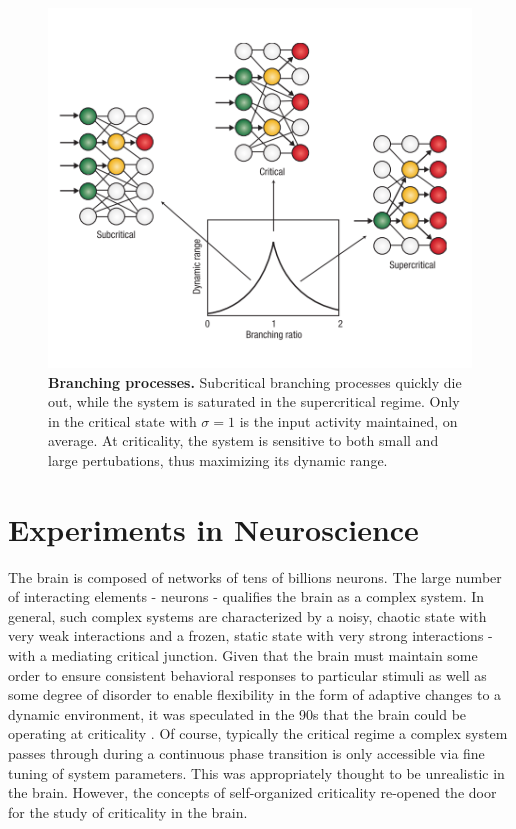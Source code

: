 \documentclass[12pt]{article}
\begin{document}
\begin{figure}      
  \begin{center}    
 \includegraphics[width=.55\textwidth]{Branchingprocesschialvo}    
    \caption{\textbf{Branching processes.} Subcritical branching processes quickly die out, while the system is saturated in the supercritical regime. Only in the critical state with $\sigma = 1$ is the input activity maintained, on average. At criticality, the system is sensitive to both small and large pertubations, thus maximizing its dynamic range. \cite{Chialvo2006a}}   
   \label{Figure::Critical Branching Process}   
  \end{center}     
   \end{figure}

\section*{Experiments in Neuroscience}

The brain is composed of networks of tens of billions neurons. The large number of interacting elements - neurons - qualifies the brain as a complex system. In general, such complex systems are characterized by a noisy, chaotic state with very weak interactions and a frozen, static state with very strong interactions - with a mediating critical junction. Given that the brain must maintain some order to ensure consistent behavioral responses to particular stimuli as well as some degree of disorder to enable flexibility in the form of adaptive changes to a dynamic environment, it was speculated in the 90s that the brain could be operating at criticality \cite{Bak1987a}. Of course, typically the critical regime a complex system passes through during a continuous phase transition is only accessible via fine tuning of system parameters. This was appropriately  thought to be unrealistic in the brain. However, the concepts of self-organized criticality re-opened the door for the study of criticality in the brain.
\end{document}
